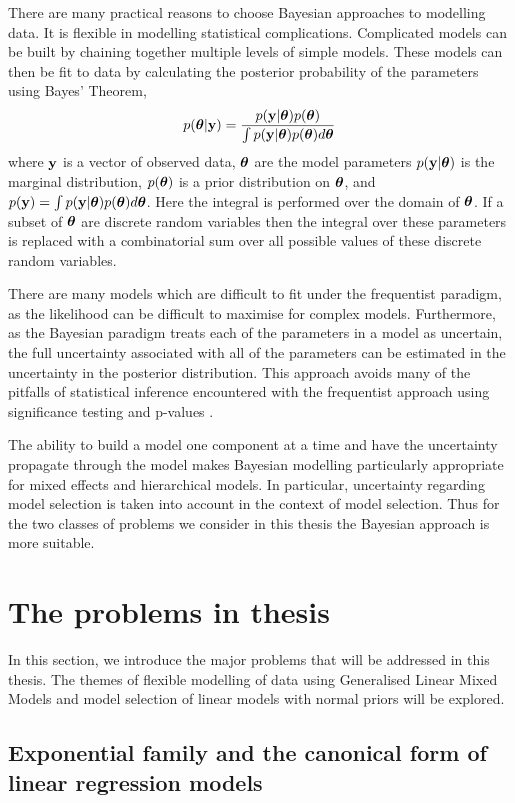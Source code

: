 There are many practical reasons to choose Bayesian approaches to modelling data. It is flexible in modelling
statistical complications. Complicated models can be built by chaining together multiple levels of simple
models. These models can then be fit to data by calculating the posterior probability of the parameters using
Bayes' Theorem,
\[
	p({\boldsymbol \theta} | {\bf y}) = \frac{p({\bf y} | {\boldsymbol \theta}) p({\boldsymbol \theta})}{\int p({\bf y} | {\boldsymbol \theta}) p({\boldsymbol \theta}) d {\boldsymbol \theta}}
\]
where ${\bf y}$ is a vector of observed data, ${\boldsymbol \theta}$ are the model parameters $p({\bf y}|{\boldsymbol \theta})$ is the marginal
distribution, $p({\boldsymbol \theta})$ is a prior distribution on ${\boldsymbol \theta}$, and $p({\bf y})=\int
p({\bf y}|{\boldsymbol \theta})p({\boldsymbol \theta})d{\boldsymbol \theta}$. Here the integral is performed over the domain of ${\boldsymbol \theta}$. If a subset of
${\boldsymbol \theta}$ are discrete random variables then the integral over these parameters is replaced with a
combinatorial sum over all possible values of these discrete random variables.

There are many models which are difficult to fit under the frequentist paradigm, as the likelihood can be
difficult to maximise for complex models. Furthermore, as the Bayesian paradigm treats each of the parameters
in a model as uncertain, the full uncertainty associated with all of the parameters can be estimated in the
uncertainty in the posterior distribution. This approach avoids many of the pitfalls of statistical inference
encountered with the frequentist approach using significance testing and p-values \citep{Cox2005}.

The ability to build a model one component at a time and have the uncertainty propagate through the model
makes Bayesian modelling  particularly appropriate for mixed effects and hierarchical models. In particular,
uncertainty regarding model selection is taken into account in the context of model selection. Thus for the
two classes of problems we consider in this thesis the Bayesian approach is more suitable.

\section{The problems in thesis}

In this section, we introduce the major problems that will be addressed in this thesis. The themes of flexible
modelling of data using Generalised Linear Mixed Models and model selection of linear models with normal
priors  will be explored.

\subsection{Exponential family and the canonical form of linear regression models}


